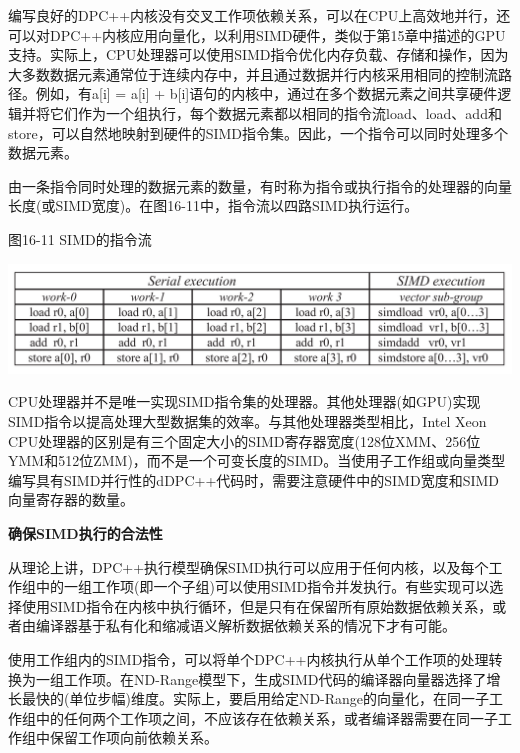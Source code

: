 编写良好的DPC++内核没有交叉工作项依赖关系，可以在CPU上高效地并行，还可以对DPC++内核应用向量化，以利用SIMD硬件，类似于第15章中描述的GPU支持。实际上，CPU处理器可以使用SIMD指令优化内存负载、存储和操作，因为大多数数据元素通常位于连续内存中，并且通过数据并行内核采用相同的控制流路径。例如，有a[i] = a[i] + b[i]语句的内核中，通过在多个数据元素之间共享硬件逻辑并将它们作为一个组执行，每个数据元素都以相同的指令流load、load、add和store，可以自然地映射到硬件的SIMD指令集。因此，一个指令可以同时处理多个数据元素。\par

由一条指令同时处理的数据元素的数量，有时称为指令或执行指令的处理器的向量长度(或SIMD宽度)。在图16-11中，指令流以四路SIMD执行运行。\par

\hspace*{\fill} \par %
图16-11 SIMD的指令流
\begin{center}
	\includegraphics[width=1.0\textwidth]{content/chapter-16/images/10}
\end{center}

CPU处理器并不是唯一实现SIMD指令集的处理器。其他处理器(如GPU)实现SIMD指令以提高处理大型数据集的效率。与其他处理器类型相比，Intel Xeon CPU处理器的区别是有三个固定大小的SIMD寄存器宽度(128位XMM、256位YMM和512位ZMM)，而不是一个可变长度的SIMD。当使用子工作组或向量类型编写具有SIMD并行性的dDPC++代码时，需要注意硬件中的SIMD宽度和SIMD向量寄存器的数量。\par

\hspace*{\fill} \par %
\textbf{确保SIMD执行的合法性}

从理论上讲，DPC++执行模型确保SIMD执行可以应用于任何内核，以及每个工作组中的一组工作项(即一个子组)可以使用SIMD指令并发执行。有些实现可以选择使用SIMD指令在内核中执行循环，但是只有在保留所有原始数据依赖关系，或者由编译器基于私有化和缩减语义解析数据依赖关系的情况下才有可能。\par

使用工作组内的SIMD指令，可以将单个DPC++内核执行从单个工作项的处理转换为一组工作项。在ND-Range模型下，生成SIMD代码的编译器向量器选择了增长最快的(单位步幅)维度。实际上，要启用给定ND-Range的向量化，在同一子工作组中的任何两个工作项之间，不应该存在依赖关系，或者编译器需要在同一子工作组中保留工作项向前依赖关系。\par

